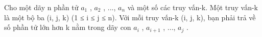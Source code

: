 Cho một dãy n phần tử $a_{1}$   ,   $a_{2}$   , ..., $a_{n}$   và một số các truy vấn-k. Một truy vấn-k là một bộ ba (i, j, k) (1 ≤ i ≤ j ≤ n). Với mỗi truy vấn-k (i, j, k), bạn phải trả về số phần tử lớn hơn k nằm trong dãy con $a_{i}$   ,   $a_{i+1}$   , ..., $a_{j}$   .